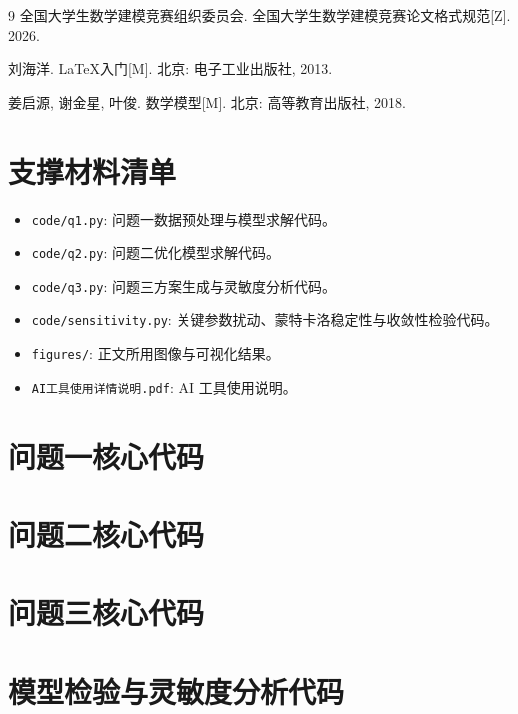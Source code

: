 \documentclass{cumcmthesis}
\begin{document}
\begin{thebibliography}{9}
  全国大学生数学建模竞赛组织委员会. 全国大学生数学建模竞赛论文格式规范[Z]. 2026.

  刘海洋. \LaTeX 入门[M]. 北京: 电子工业出版社, 2013.

  姜启源, 谢金星, 叶俊. 数学模型[M]. 北京: 高等教育出版社, 2018.
\end{thebibliography}

\newpage

\begin{appendices}

\section{支撑材料清单}
\begin{itemize}
  \item \texttt{code/q1.py}: 问题一数据预处理与模型求解代码。
  \item \texttt{code/q2.py}: 问题二优化模型求解代码。
  \item \texttt{code/q3.py}: 问题三方案生成与灵敏度分析代码。
  \item \texttt{code/sensitivity.py}: 关键参数扰动、蒙特卡洛稳定性与收敛性检验代码。
  \item \texttt{figures/}: 正文所用图像与可视化结果。
  \item \texttt{AI工具使用详情说明.pdf}: AI 工具使用说明。
\end{itemize}

\section{问题一核心代码}


\section{问题二核心代码}


\section{问题三核心代码}


\section{模型检验与灵敏度分析代码}


\end{appendices}
\end{document}

